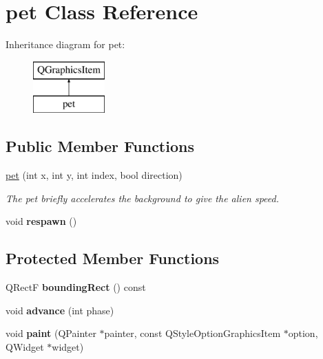 \hypertarget{classpet}{\section{pet Class Reference}
\label{classpet}
}
Inheritance diagram for pet\-:\begin{figure}[H]
\begin{center}
\leavevmode
\includegraphics[height=2.000000cm]{classpet}
\end{center}
\end{figure}
\subsection*{Public Member Functions}
\begin{DoxyCompactItemize}
\item 
\hyperlink{classpet_a658aa4452ce51a0b9f7a30855311aaa5}{pet} (int x, int y, int index, bool direction)
\begin{DoxyCompactList}\small\item\em The pet briefly accelerates the background to give the alien speed. \end{DoxyCompactList}\item 
\hypertarget{classpet_a14bbbcb7a01d9c20ccbc3547965291b0}{void {\bfseries respawn} ()}\label{classpet_a14bbbcb7a01d9c20ccbc3547965291b0}

\end{DoxyCompactItemize}
\subsection*{Protected Member Functions}
\begin{DoxyCompactItemize}
\item 
\hypertarget{classpet_ac061847fd6e38d2ef34083da723d85cf}{Q\-Rect\-F {\bfseries bounding\-Rect} () const }\label{classpet_ac061847fd6e38d2ef34083da723d85cf}

\item 
\hypertarget{classpet_a4993baf1888369354747b7df9c6174fd}{void {\bfseries advance} (int phase)}\label{classpet_a4993baf1888369354747b7df9c6174fd}

\item 
\hypertarget{classpet_ac341f1b4ebbc0719e5f65a72306b98f5}{void {\bfseries paint} (Q\-Painter $\ast$painter, const Q\-Style\-Option\-Graphics\-Item $\ast$option, Q\-Widget $\ast$widget)}\label{classpet_ac341f1b4ebbc0719e5f65a72306b98f5}

\end{DoxyCompactItemize}
